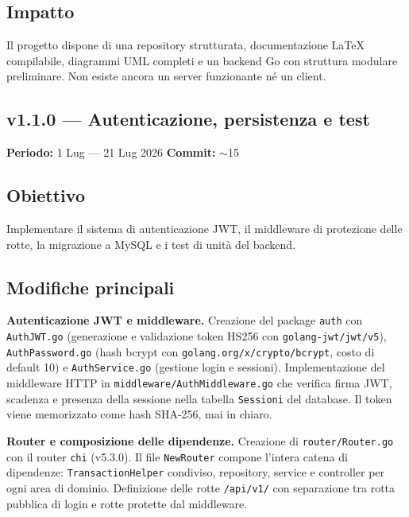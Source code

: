 \documentclass[a4paper,12pt]{article}
\begin{document}
\subsection*{Impatto}
Il progetto dispone di una repository strutturata, documentazione LaTeX compilabile, diagrammi UML completi e un backend Go con struttura modulare preliminare. Non esiste ancora un server funzionante n\'{e} un client.

\newpage

\begin{decisionbox}
\section*{v1.1.0 --- Autenticazione, persistenza e test}
\textbf{Periodo:} 1 Lug --- 21 Lug 2026 \hfill \textbf{Commit:} $\sim$15
\end{decisionbox}

\subsection*{Obiettivo}
Implementare il sistema di autenticazione JWT, il middleware di protezione delle rotte, la migrazione a MySQL e i test di unit\`{a} del backend.

\subsection*{Modifiche principali}

\textbf{Autenticazione JWT e middleware.}
Creazione del package \texttt{auth} con \texttt{AuthJWT.go} (generazione e validazione token HS256 con \texttt{golang-jwt/jwt/v5}), \texttt{AuthPassword.go} (hash bcrypt con \texttt{golang.org/x/crypto/bcrypt}, costo di default 10) e \texttt{AuthService.go} (gestione login e sessioni). Implementazione del middleware HTTP in \texttt{middleware/AuthMiddleware.go} che verifica firma JWT, scadenza e presenza della sessione nella tabella \texttt{Sessioni} del database. Il token viene memorizzato come hash SHA-256, mai in chiaro.

\textbf{Router e composizione delle dipendenze.}
Creazione di \texttt{router/Router.go} con il router \texttt{chi} (v5.3.0). Il file \texttt{NewRouter} compone l'intera catena di dipendenze: \texttt{TransactionHelper} condiviso, repository, service e controller per ogni area di dominio. Definizione delle rotte \texttt{/api/v1/} con separazione tra rotta pubblica di login e rotte protette dal middleware.
\end{document}
